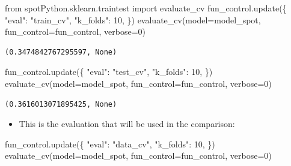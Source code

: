 \documentclass[
  letterpaper,
  DIV=11,
  numbers=noendperiod]{scrreprt}
\newenvironment{Shaded}{\begin{snugshade}}{\end{snugshade}}
\newcommand{\DecValTok}[1]{\textcolor[rgb]{0.68,0.00,0.00}{#1}}
\newcommand{\ImportTok}[1]{\textcolor[rgb]{0.00,0.46,0.62}{#1}}
\newcommand{\NormalTok}[1]{\textcolor[rgb]{0.00,0.23,0.31}{#1}}
\newcommand{\OperatorTok}[1]{\textcolor[rgb]{0.37,0.37,0.37}{#1}}
\newcommand{\StringTok}[1]{\textcolor[rgb]{0.13,0.47,0.30}{#1}}
\providecommand{\tightlist}{%
  \setlength{\itemsep}{0pt}\setlength{\parskip}{0pt}}\usepackage{longtable,booktabs,array}
\begin{document}
\begin{Shaded}
\begin{Highlighting}[]
\ImportTok{from}\NormalTok{ spotPython.sklearn.traintest }\ImportTok{import}\NormalTok{ evaluate\_cv}
\NormalTok{fun\_control.update(\{}
     \StringTok{"eval"}\NormalTok{: }\StringTok{"train\_cv"}\NormalTok{,}
     \StringTok{"k\_folds"}\NormalTok{: }\DecValTok{10}\NormalTok{,}
\NormalTok{\})}
\NormalTok{evaluate\_cv(model}\OperatorTok{=}\NormalTok{model\_spot, fun\_control}\OperatorTok{=}\NormalTok{fun\_control, verbose}\OperatorTok{=}\DecValTok{0}\NormalTok{)}
\end{Highlighting}
\end{Shaded}

\begin{verbatim}
(0.3474842767295597, None)
\end{verbatim}

\begin{Shaded}
\begin{Highlighting}[]
\NormalTok{fun\_control.update(\{}
     \StringTok{"eval"}\NormalTok{: }\StringTok{"test\_cv"}\NormalTok{,}
     \StringTok{"k\_folds"}\NormalTok{: }\DecValTok{10}\NormalTok{,}
\NormalTok{\})}
\NormalTok{evaluate\_cv(model}\OperatorTok{=}\NormalTok{model\_spot, fun\_control}\OperatorTok{=}\NormalTok{fun\_control, verbose}\OperatorTok{=}\DecValTok{0}\NormalTok{)}
\end{Highlighting}
\end{Shaded}

\begin{verbatim}
(0.3616013071895425, None)
\end{verbatim}

\begin{itemize}
\tightlist
\item
  This is the evaluation that will be used in the comparison:
\end{itemize}

\begin{Shaded}
\begin{Highlighting}[]
\NormalTok{fun\_control.update(\{}
     \StringTok{"eval"}\NormalTok{: }\StringTok{"data\_cv"}\NormalTok{,}
     \StringTok{"k\_folds"}\NormalTok{: }\DecValTok{10}\NormalTok{,}
\NormalTok{\})}
\NormalTok{evaluate\_cv(model}\OperatorTok{=}\NormalTok{model\_spot, fun\_control}\OperatorTok{=}\NormalTok{fun\_control, verbose}\OperatorTok{=}\DecValTok{0}\NormalTok{)}
\end{Highlighting}
\end{Shaded}
\end{document}
